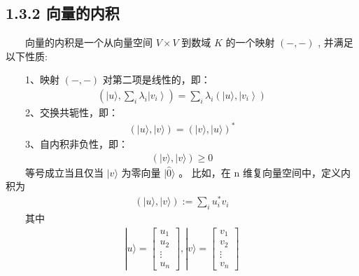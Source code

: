 \documentclass[a4paper,11pt,english]{sphinxmanual}
\begin{document}
\subsection{1.3.2 向量的内积}
\label{\detokenize{rst/_u9644_u5f551_u91cf_u5b50_u8ba1_u7b97_u6570_u5b66_u57fa_u78402:id3}}
\sphinxAtStartPar
​  向量的内积是一个从向量空间  \(V \times V\) 到数域 \(K\) 的一个映射  \((-,-)\) , 并满足以下性质:

\sphinxAtStartPar
​  1、映射  \((-,-)\) 对第二项是线性的，即：
\begin{equation*}
\begin{split}\left(|u\rangle, \sum_{i} \lambda_{i}\left|v_{i}\right\rangle\right)=\sum_{i} \lambda_{i}\left(|u\rangle,\left|v_{i}\right\rangle\right)\end{split}
\end{equation*}
\sphinxAtStartPar
​  2、交换共轭性，即：
\begin{equation*}
\begin{split}(|u\rangle,|v\rangle)=(|v\rangle,|u\rangle)^{*}\end{split}
\end{equation*}
\sphinxAtStartPar
​  3、自内积非负性，即：
\begin{equation*}
\begin{split}(|v\rangle,|v\rangle) \geq 0\end{split}
\end{equation*}
\sphinxAtStartPar
​  等号成立当且仅当  \(|v\rangle\) 为零向量  \(|\hat{0}\rangle\) 。 比如，在  \(\mathrm{n}\) 维复向量空间中，定义内积为
\begin{equation*}
\begin{split}(|u\rangle,|v\rangle):=\sum_{i} u_{i}^{*} v_{i}\end{split}
\end{equation*}
\sphinxAtStartPar
​  其中
\begin{equation*}
\begin{split}|u\rangle=\left[\begin{array}{c} u_{1} \\ u_{2} \\ \vdots \\ u_{n} \end{array}\right],|v\rangle=\left[\begin{array}{c} v_{1} \\ v_{2} \\ \vdots \\ v_{n} \end{array}\right]\end{split}
\end{equation*}
\end{document}
